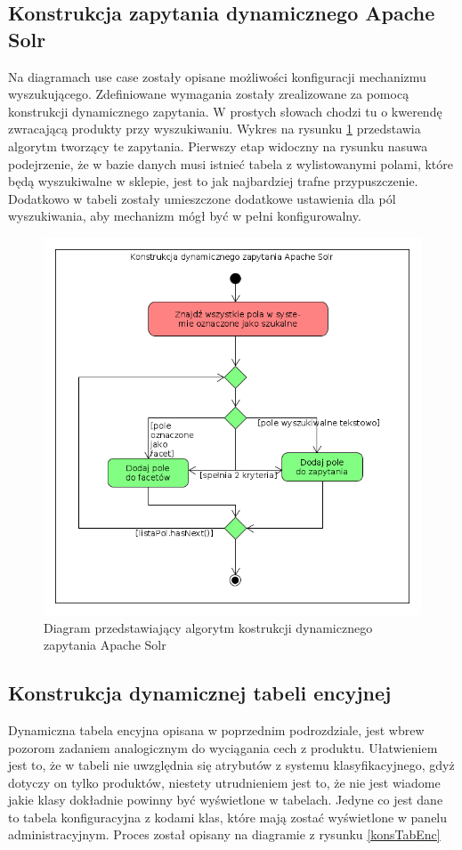 \subsection{Konstrukcja zapytania dynamicznego Apache Solr}
Na diagramach use case zostały opisane możliwości konfiguracji mechanizmu wyszukującego. Zdefiniowane wymagania zostały zrealizowane za pomocą konstrukcji dynamicznego zapytania. W prostych słowach chodzi tu o kwerendę zwracającą produkty przy wyszukiwaniu. Wykres na rysunku \ref{konsDynZapy} przedstawia algorytm tworzący te zapytania. Pierwszy etap widoczny na rysunku nasuwa podejrzenie, że w bazie danych musi istnieć tabela z wylistowanymi polami, które będą wyszukiwalne w sklepie, jest to jak najbardziej trafne przypuszczenie. Dodatkowo w tabeli zostały umieszczone dodatkowe ustawienia dla pól wyszukiwania, aby mechanizm mógł być w pełni konfigurowalny. 
\begin{figure}
	\begin{center}
		\includegraphics[scale=0.5]{konsDynZapy.png}
	\end{center}
	\caption{{\color{black}Diagram przedstawiający algorytm kostrukcji dynamicznego zapytania Apache Solr}} \label{konsDynZapy}
\end{figure}
\subsection{Konstrukcja dynamicznej tabeli encyjnej}
Dynamiczna tabela encyjna opisana w poprzednim podrozdziale, jest wbrew pozorom zadaniem analogicznym do wyciągania cech z produktu. Ułatwieniem jest to, że w tabeli nie uwzględnia się atrybutów z systemu klasyfikacyjnego, gdyż dotyczy on tylko produktów, niestety utrudnieniem jest to, że nie jest wiadome jakie klasy dokładnie powinny być wyświetlone w tabelach. Jedyne co jest dane to tabela konfiguracyjna z kodami klas, które mają zostać wyświetlone w panelu administracyjnym. Proces został opisany na diagramie z rysunku \ref{konsTabEnc} 

